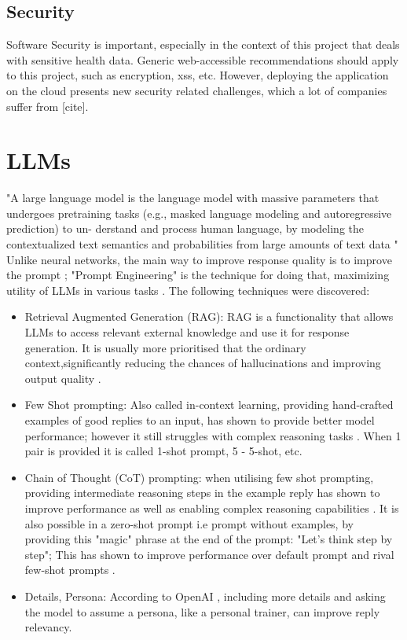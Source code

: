 \subsection{Security}
Software Security is important, especially in the context of this project that deals with sensitive health data. Generic web-accessible recommendations should apply to this project, such as encryption, xss, etc. However, deploying the application on the cloud presents new security related challenges, which a lot of companies suffer from [cite]. 
\section{LLMs}
"A large language model is the language model with massive
parameters that undergoes pretraining tasks (e.g., masked
language modeling and autoregressive prediction) to un-
derstand and process human language, by modeling the
contextualized text semantics and probabilities from large
amounts of text data " \cite{Yao2023ASO}
Unlike neural networks, the main way to improve response quality is to improve the prompt \cite{Liu2021PretrainPA}; "Prompt Engineering" is the technique for doing that, maximizing utility of LLMs in various tasks \cite{zhou2023large}. The following techniques were discovered:
\begin{itemize}
   \item Retrieval Augmented Generation (RAG): RAG is a functionality that allows LLMs to access relevant external knowledge and use it for response generation. It is usually more prioritised that the ordinary context,significantly reducing the chances of hallucinations and improving output quality \cite{gao2024retrievalaugmented}.
   \item Few Shot prompting: Also called in-context learning, providing hand-crafted examples of good replies to an input, has shown to provide better model performance; however it still struggles with complex reasoning tasks \cite{brown2020language, min2022rethinking}. When 1 pair is provided it is called 1-shot prompt, 5 - 5-shot, etc. 
   \item Chain of Thought (CoT) prompting: when utilising few shot prompting, providing intermediate reasoning steps in the example reply has shown to improve performance as well as enabling complex reasoning capabilities \cite{wei2023chainofthought}. It is also possible in a zero-shot prompt i.e prompt without examples, by providing this "magic" phrase at the end of the prompt: "Let's think step by step"; This has shown to improve performance over default prompt and rival few-shot prompts \cite{kojima2023large}.
   \item Details, Persona: According to OpenAI \cite{openAI}, including more details and asking the model to assume a persona, like a personal trainer, can improve reply relevancy. 
\end{itemize}
